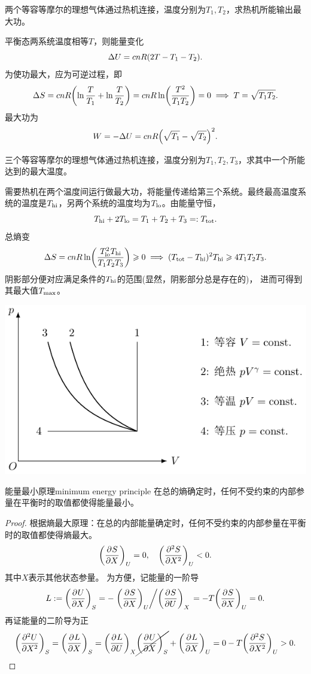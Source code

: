 \begin{example}{}{}
	两个等容等摩尔的理想气体通过热机连接，温度分别为$T_1,T_2$，求热机所能输出最大功。

	平衡态两系统温度相等$T$，则能量变化
	\[
		\D U=cnR(2T-T_1-T_2).
	\]
	为使功最大，应为可逆过程，即
	\[
		\D S=cnR\biggkh{\ln\frac T{T_1}+\ln\frac T{T_2}}=cnR\ln\biggkh{\frac{T^2}{T_1T_2}}=0
		\implies T=\sqrt{T_1T_2}.
	\]
	最大功为
	\[
		W=-\D U=cnR\Bigkh{\sqrt{T_1}-\sqrt{T_2}}^2.
	\]
\end{example}
\begin{example}{}{}
	三个等容等摩尔的理想气体通过热机连接，温度分别为$T_1,T_2,T_3$，求其中一个所能达到的最大温度。

	需要热机在两个温度间运行做最大功，将能量传递给第三个系统。最终最高温度系统的温度是$T\hi$，另两个系统的温度均为$T\lo$。由能量守恒，
	\[
		T\hi+2T\lo=T_1+T_2+T_3=:T\tot.
	\]
	总熵变
	\[
		\D S=cnR\ln\biggkh{\frac{T\lo^2T\hi}{T_1T_2T_3}}\geq 0
		\implies(T\tot-T\hi)^2T\hi\geq 4T_1T_2T_3.
	\]
	阴影部分便对应满足条件的$T\hi$的范围(显然，阴影部分总是存在的)，
	进而可得到其最大值$T\maxi$。
	\begin{center}
		\includegraphics[page=7]{figures/tikz/coordinates.pdf}
	\end{center}
\end{example}

\begin{theorem}
	{能量最小原理}{minimum energy principle}
	在总的熵确定时，任何不受约束的内部参量在平衡时的取值都使得能量最小。
\end{theorem}

\begin{proof}
	根据熵最大原理：在总的内部能量确定时，任何不受约束的内部参量在平衡时的取值都使得熵最大。
	\[
		\pu[U]SX=0,\quad\biggkh{\pv[2]SX}_U<0.
	\]
	其中$X$表示其他状态参量。
	为方便，记能量的一阶导
	\[
		L:=\pu[S]UX=-\division{\pu[U]SX}{\pu[X]SU}=-T\pu[U]SX=0.
	\]
	再证能量的二阶导为正
	\[
		\biggkh{\pv[2]UX}_S=\pu[S]LX=\pu[X]LU\cancel{\pu[S]UX}+\pu[U]LX=0-T\biggkh{\pv[2]SX}_U>0.
		\qedhere
	\]
\end{proof}

